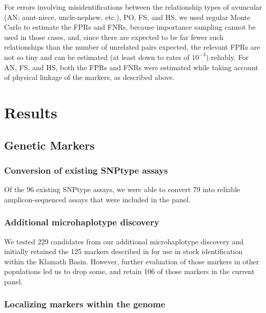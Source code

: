 For errors involving misidentifications between the relationship
types of avuncular (AN: aunt-niece, uncle-nephew, etc.), PO, FS, and HS,
we used regular Monte Carlo to estimate the FPRs and FNRs, because
importance sampling cannot be used in those cases, and, since there are
expected to be far fewer such relationships than the number of unrelated
pairs expected, the relevant FPRs are not so tiny and can be estimated
(at least down to rates of $10^{-3}$) reliably.  For AN, FS, and HS, both the
FPRs and FNRs were estimated while taking account of physical linkage
of the markers, as described above.

\section*{Results}

\subsection*{Genetic Markers}

\subsubsection*{Conversion of existing SNPtype assays}

Of the 96 existing SNPtype assays, we were able to convert 79
into reliable amplicon-sequenced assays that were included in the panel.

\subsubsection*{Additional microhaplotype discovery} 

We tested 229 candidates from our additional microhaplotype discovery and
initially retained the 125 markers described in \citep{thompson2020complex}
for use in stock identification within
the Klamath Basin.  However, further evaluation of those markers in other
populations led us to drop some, and retain 106 of those markers in the current panel.

\subsubsection*{Localizing markers within the genome}

